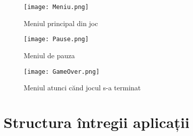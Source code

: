 \vspace{10mm}
\begin{figure}[H]
\centering
\texttt{[image: Meniu.png]} \par
\caption{Meniul principal din joc}
\end{figure}

\vspace{10mm}
\begin{figure}[H]
\centering
\texttt{[image: Pause.png]} \par
\caption{Meniul de pauza}
\end{figure}

\vspace{10mm}
\begin{figure}[H]
\centering
\texttt{[image: GameOver.png]} \par
\caption{Meniul atunci cănd jocul s-a terminat}
\end{figure}

\section{Structura întregii aplicații}